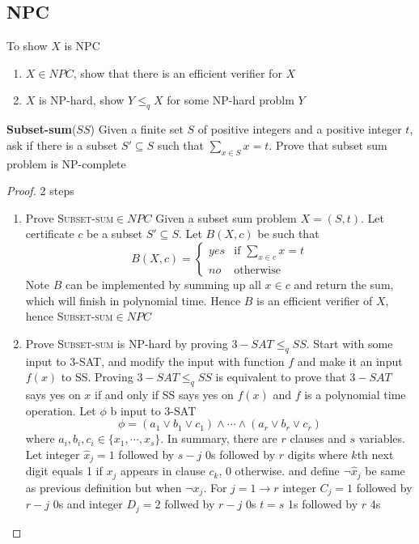 \documentclass[11pt]{article}
\begin{document}
\subsection*{NPC}

To show $X$ is NPC 

\begin{enumerate}
    \item $X\in NPC$, show that there is an efficient verifier for $X$
    \item $X$ is NP-hard, show $Y \leq_q X$ for some NP-hard problm $Y$
\end{enumerate}

\begin{example}
    \textbf{Subset-sum}($SS$) Given a finite set $S$ of positive integers and a positive integer $t$, ask if there is a subset $S' \subseteq S$ such that $\sum_{x\in S} x = t$. Prove that subset sum problem is NP-complete
    \begin{proof}
        2 steps
        \begin{enumerate}
            \item Prove \textsc{Subset-sum}$\in NPC$ Given a subset sum problem $X = (S,t)$. Let certificate $c$ be a subset $S'\subseteq S$. Let $B(X,c)$ be such that  
            \[
                B(X,c) = 
                \begin{cases}
                    yes & \text{if } \sum_{x\in c} x = t\\
                    no & \text{otherwise}
                \end{cases}
            \]
            Note $B$ can be implemented by summing up all $x\in c$ and return the sum, which will finish in polynomial time. Hence $B$ is an efficient verifier of $X$, hence  \textsc{Subset-sum}$\in NPC$
            \item Prove \textsc{Subset-sum} is NP-hard by proving $3-SAT \leq_q SS$. Start with some input to 3-SAT, and modify the input with function $f$ and make it an input $f(x)$ to SS. Proving $3-SAT\leq_q SS$ is equivalent to prove that $3-SAT$ says yes on $x$ if and only if SS says yes on $f(x)$ and $f$ is a polynomial time operation. Let $\phi$ b input to 3-SAT
            \[
                \phi  = (a_1 \lor b_1 \lor c_1) \land \cdots \land (a_r \lor b_r \lor c_r)
            \]
            where $a_i, b_i, c_i \in \{ x_1, \cdots, x_s \}$. In summary, there are $r$ clauses and $s$ variables. Let integer $\hat{x}_j = 1$ followed by $s-j$ 0s followed by $r$ digits where $k$th next digit equals 1 if $x_j$ appears in clause $c_k$, 0 otherwise. and define $\neg \hat{x}_j$ be same as previous definition but when $\neg x_j$. For $j = 1\to r$ integer $C_j = 1$ followed by $r-j$ 0s and integer $D_j = 2$ follwed by $r-j$ 0s $t = s$ 1s followed by $r$ 4s\\

\end{enumerate}
\end{proof}
\end{example}
\end{document}
